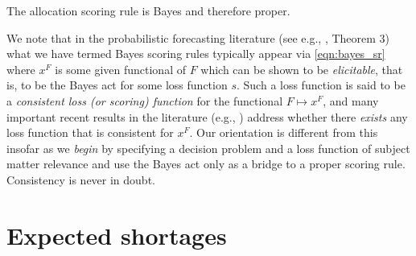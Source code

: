 \documentclass{article}
\begin{document}
The allocation scoring rule is Bayes and therefore proper.

We note that in the probabilistic forecasting literature (see e.g., \cite{gneiting2011making}, Theorem 3) what we have
termed Bayes scoring rules typically appear via \eqref{eqn:bayes_sr} where $x^F$ is some given functional of $F$ which
can be shown to be \emph{elicitable}, that is, to be the Bayes act for some loss function $s$.
Such a loss function is said to be a \emph{consistent loss (or scoring) function} for the functional $F \mapsto x^F$, and many important
recent results in the literature (e.g., \cite{fisslerziegel2016consistency}) address whether there \emph{exists} any loss
function that is consistent for $x^F$. Our orientation
is different from this insofar as we \emph{begin} by specifying a decision problem and a loss function of subject matter relevance
and use the Bayes act only as a bridge to a proper scoring rule.  Consistency is never in doubt.


\section{Expected shortages}
\label{sec:ex-shortage}
\end{document}
